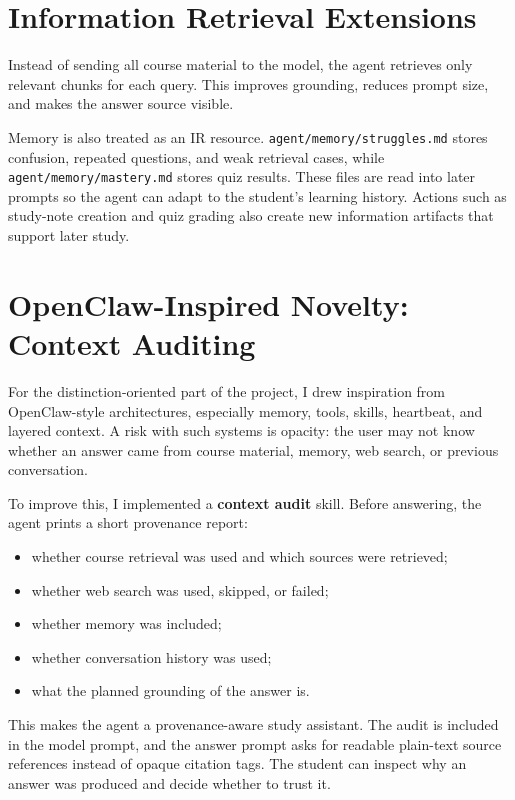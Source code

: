 \documentclass[10pt,a4paper]{article}
\begin{document}
\section{Information Retrieval Extensions}

Instead of sending all course material to the model, the agent retrieves only relevant chunks for each query. This improves grounding, reduces prompt size, and makes the answer source visible.

Memory is also treated as an IR resource. \texttt{agent/memory/struggles.md} stores confusion, repeated questions, and weak retrieval cases, while \texttt{agent/memory/mastery.md} stores quiz results. These files are read into later prompts so the agent can adapt to the student's learning history. Actions such as study-note creation and quiz grading also create new information artifacts that support later study.

\section{OpenClaw-Inspired Novelty: Context Auditing}

For the distinction-oriented part of the project, I drew inspiration from OpenClaw-style architectures, especially memory, tools, skills, heartbeat, and layered context. A risk with such systems is opacity: the user may not know whether an answer came from course material, memory, web search, or previous conversation.

To improve this, I implemented a \textbf{context audit} skill. Before answering, the agent prints a short provenance report:

\begin{itemize}
    \item whether course retrieval was used and which sources were retrieved;
    \item whether web search was used, skipped, or failed;
    \item whether memory was included;
    \item whether conversation history was used;
    \item what the planned grounding of the answer is.
\end{itemize}

This makes the agent a provenance-aware study assistant. The audit is included in the model prompt, and the answer prompt asks for readable plain-text source references instead of opaque citation tags. The student can inspect why an answer was produced and decide whether to trust it.
\end{document}
